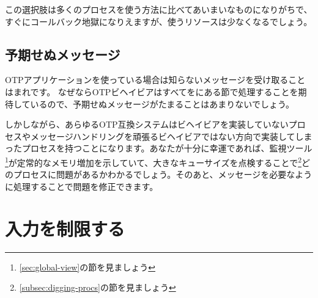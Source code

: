 この選択肢は多くのプロセスを使う方法に比べてあいまいなものになりがちで、すぐにコールバック地獄になりえますが、使うリソースは少なくなるでしょう。

\subsection{予期せぬメッセージ}

OTPアプリケーションを使っている場合は知らないメッセージを受け取ることはまれです。
なぜならOTPビヘイビアはすべてをにある節で処理することを期待しているので、予期せぬメッセージがたまることはあまりないでしょう。

しかしながら、あらゆるOTP互換システムはビヘイビアを実装していないプロセスやメッセージハンドリングを頑張るビヘイビアではない方向で実装してしまったプロセスを持つことになります。あなたが十分に幸運であれば、監視ツール\footnote{\ref{sec:global-view}の節を見ましょう}が定常的なメモリ増加を示していて、大きなキューサイズを点検することで\footnote{\ref{subsec:digging-procs}の節を見ましょう}どのプロセスに問題があるかわかるでしょう。そのあと、メッセージを必要なように処理することで問題を修正できます。

\section{入力を制限する}

